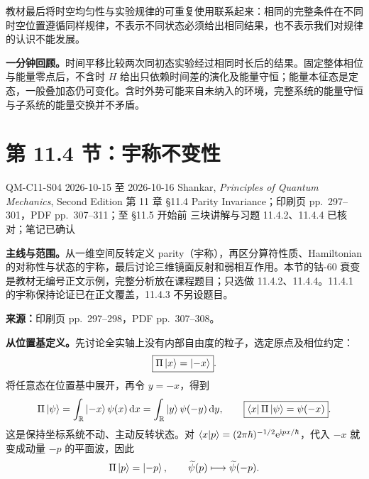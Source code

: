 教材最后将时空均匀性与实验规律的可重复使用联系起来：相同的完整条件在不同时空位置遵循同样规律，不表示不同状态必须给出相同结果，也不表示我们对规律的认识不能发展。

\textbf{一分钟回顾。}时间平移比较两次同初态实验经过相同时长后的结果。固定整体相位与能量零点后，不含时 $H$ 给出只依赖时间差的演化及能量守恒；能量本征态是定态，一般叠加态仍可变化。含时外势可能来自未纳入的环境，完整系统的能量守恒与子系统的能量交换并不矛盾。

\section{第 11.4 节：宇称不变性}
\label{section:QM-C11-S04}
\studymeta
  {QM-C11-S04}
  {2026-10-15 至 2026-10-16}
  {Shankar, \textit{Principles of Quantum Mechanics}, Second Edition}
  {第 11 章 \S 11.4 Parity Invariance；印刷页 pp.~297--301，PDF pp.~307--311；至 \S 11.5 开始前}
  {三块讲解与习题 11.4.2、11.4.4 已核对；笔记已确认}

\textbf{主线与范围。}从一维空间反转定义 parity（宇称），再区分算符性质、Hamiltonian 的对称性与状态的宇称，最后讨论三维镜面反射和弱相互作用。本节的钴-60 衰变是教材无编号正文示例，完整分析放在课程题目；只选做 11.4.2、11.4.4。11.4.1 的宇称保持论证已在正文覆盖，11.4.3 不另设题目。

\textbf{来源：}印刷页 pp.~297--298，PDF pp.~307--308。

\textbf{从位置基定义。}先讨论全实轴上没有内部自由度的粒子，选定原点及相位约定：
\begin{equation}
  \boxed{\Pi\left|x\right\rangle=\left|-x\right\rangle}.
\end{equation}
将任意态在位置基中展开，再令 $y=-x$，得到
\begin{equation}
  \Pi\left|\psi\right\rangle
    =\int_{\mathbb{R}}\left|-x\right\rangle\psi(x)\mathop{}\!\mathrm{d} x
      =\int_{\mathbb{R}}\left|y\right\rangle\psi(-y)\mathop{}\!\mathrm{d} y,
  \qquad \boxed{\left\langle x\right|\Pi\left|\psi\right\rangle=\psi(-x)}.
\end{equation}
这是保持坐标系统不动、主动反转状态。对 $\left\langle x \middle| p \right\rangle=(2\pi\hbar)^{-1/2}\mathrm{e}^{\mathrm{i} px/\hbar}$，代入 $-x$ 就变成动量 $-p$ 的平面波，因此
\begin{equation}
  \Pi\left|p\right\rangle=\left|-p\right\rangle,\qquad
  \widetilde\psi(p)\longmapsto\widetilde\psi(-p).
\end{equation}

